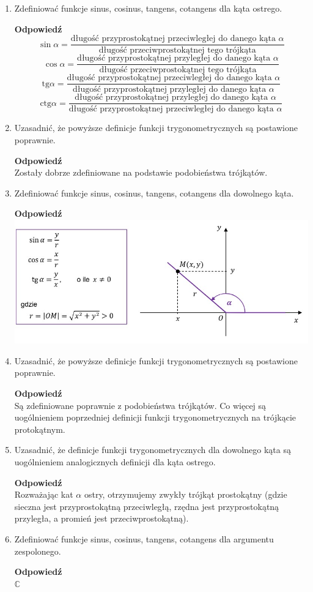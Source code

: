 \documentclass[12pt,a4paper]{article}
\theoremstyle{break}
\newcommand{\Odp}[1]{
		\begin{mdframed}[style=zadanie]
			\textbf{Odpowiedź}\\
			#1
		\end{mdframed}
	}
\newcommand{\tg}{\text{tg}}
\newcommand{\ctg}{\text{ctg}}
\begin{document}
\begin{enumerate}[1.]
	\item Zdeﬁniować funkcje sinus, cosinus, tangens, cotangens dla kąta ostrego.
	\Odp{
		$$\sin\alpha=\frac{\text{długość przyprostokątnej przeciwległej do danego kąta } \alpha}{\text{długość przeciwprostokątnej tego trójkąta}}$$
		$$\cos\alpha=\frac{\text{długość przyprostokątnej przyległej do danego kąta } \alpha}{\text{długość przeciwprostokątnej tego trójkąta}}$$
		$$\tg\alpha=\frac{\text{długość przyprostokątnej przeciwległej do danego kąta } \alpha}{\text{długość przyprostokątnej przyległej do danego kąta } \alpha}$$
		$$\ctg\alpha=\frac{\text{długość przyprostokątnej przyległej do danego kąta } \alpha}{\text{długość przyprostokątnej przeciwległej do danego kąta } \alpha}$$
	}
	
	\item Uzasadnić, że powyższe deﬁnicje funkcji trygonometrycznych są postawione poprawnie.
	\Odp{
		Zostały dobrze zdefiniowane na podstawie podobieństwa trójkątów.
	}
	\newpage
	\item Zdeﬁniować funkcje sinus, cosinus, tangens, cotangens dla dowolnego kąta.
	\Odp{
		\includegraphics[width=\linewidth]{tryg_def.jpeg}
	}
	
	\item Uzasadnić, że powyższe deﬁnicje funkcji trygonometrycznych są postawione poprawnie.
	\Odp{
		Są zdefiniowane poprawnie z podobieństwa trójkątów. Co więcej są uogólnieniem poprzedniej definicji funkcji trygonometrycznych na trójkącie protokątnym.
	}
	
	\item Uzasadnić, że deﬁnicje funkcji trygonometrycznych dla dowolnego kąta są uogólnieniem analogicznych deﬁnicji dla kąta ostrego.
	\Odp{
		Rozważając kat $\alpha$ ostry, otrzymujemy zwykły trójkąt prostokątny (gdzie sieczna jest przyprostokątną przeciwległą, rzędna jest przyprostokątną przyległa, a promień jest przeciwprostokątną).
	}
	
	\item Zdeﬁniować funkcje sinus, cosinus, tangens, cotangens dla argumentu zespolonego.
	\Odp{
		$\mathbb{C}$
		
}
\end{enumerate}
\end{document}
